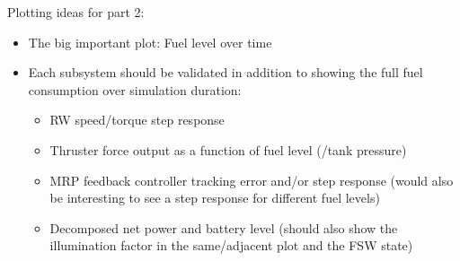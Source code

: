 
Plotting ideas for part 2:
\begin{itemize}
    \item The big important plot: Fuel level over time
    \item Each subsystem should be validated in addition to showing the full fuel consumption over simulation duration:
    \begin{itemize}
        \item RW speed/torque step response
        \item Thruster force output as a function of fuel level (/tank pressure)
        \item MRP feedback controller tracking error and/or step response (would also be interesting to see a step response for different fuel levels)
        \item Decomposed net power and battery level (should also show the illumination factor in the same/adjacent plot and the FSW state)
    \end{itemize}
\end{itemize}
